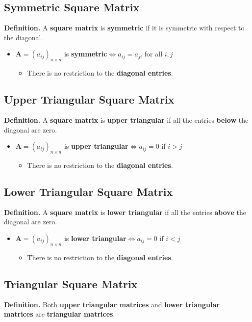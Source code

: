 \documentclass[../ma2001_notes.tex]{subfiles}
\begin{document}
\subsection{Symmetric Square Matrix}
\textbf{Definition.} A \textbf{square matrix} is \textbf{symmetric} if it is symmetric with respect to the diagonal.
\begin{itemize}
	\item\(\bm{A}=(a_{ij})_{n\times n}\) is \textbf{symmetric}\(\iff a_{ij}=a_{ji}\) for all \(i, j\)
	\begin{itemize}
		\item There is no restriction to the \textbf{diagonal entries}.
	\end{itemize}
\end{itemize}

\subsection{Upper Triangular Square Matrix}
\textbf{Definition.} A \textbf{square matrix} is \textbf{upper triangular} if all the entries \textbf{below} the diagonal are zero.
\begin{itemize}
	\item\(\bm{A}=(a_{ij})_{n\times n}\) is \textbf{upper triangular}\(\iff a_{ij}=0\) if \(i>j\)
	\begin{itemize}
		\item There is no restriction to the \textbf{diagonal entries}.
	\end{itemize}
\end{itemize}

\subsection{Lower Triangular Square Matrix}
\textbf{Definition.} A \textbf{square matrix} is \textbf{lower triangular} if all the entries \textbf{above} the diagonal are zero.
\begin{itemize}
	\item\(\bm{A}=(a_{ij})_{n\times n}\) is \textbf{lower triangular}\(\iff a_{ij}=0\) if \(i<j\)
	\begin{itemize}
		\item There is no restriction to the \textbf{diagonal entries}.
	\end{itemize}
\end{itemize}

\subsection{Triangular Square Matrix}
\textbf{Definition.} Both \textbf{upper triangular matrices} and \textbf{lower triangular matrices} are \textbf{triangular matrices}.
\end{document}
